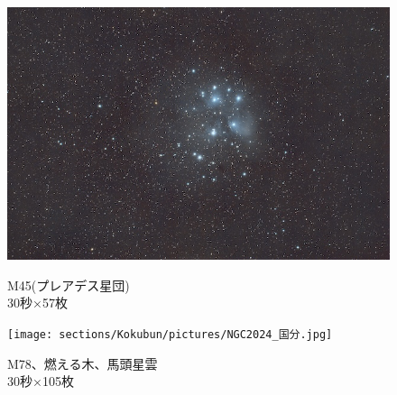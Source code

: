 \begin{figure}[H]
  \centering
  \begin{minipage}{0.48\linewidth}
    \centering
    \includegraphics[width=\linewidth]{sections/Kokubun/pictures/M45.jpg}
    \caption{M45(プレアデス星団)\\
  30秒×57枚}
  \label{M45}
  \end{minipage}
  \begin{minipage}{0.48\linewidth}
    \centering
    \texttt{[image: sections/Kokubun/pictures/NGC2024\_国分.jpg]}
    \caption{M78、燃える木、馬頭星雲\\
  30秒×105枚}
  \label{M4}
  \end{minipage}
\end{figure}





